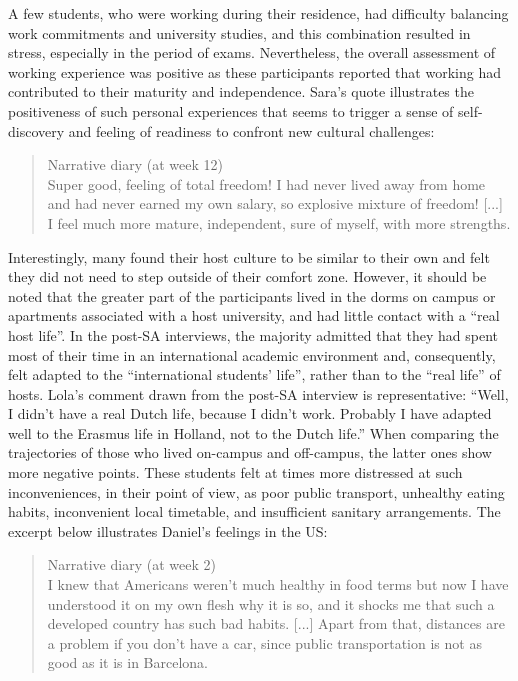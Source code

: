 \documentclass[output=paper]{langsci/langscibook}
\begin{document}
A few students, who were working during their residence, had difficulty balancing work commitments and university studies, and this combination resulted in stress, especially in the period of exams. Nevertheless, the overall assessment of working experience was positive as these participants reported that working had contributed to their maturity and independence. Sara’s quote illustrates the positiveness of such personal experiences that seems to trigger a sense of self-discovery and feeling of readiness to confront new cultural challenges:

\begin{quote}
Narrative diary (at week 12) 
\smallskip\\
Super good, feeling of total freedom! I had never lived away from home and had never earned my own salary, so explosive mixture of freedom! [...] I feel much more mature, independent, sure of myself, with more strengths. 
\end{quote}

Interestingly, many found their host culture to be similar to their own and felt they did not need to step outside of their comfort zone. However, it should be noted that the greater part of the participants lived in the dorms on campus or apartments associated with a host university, and had little contact with a “real host life”. In the post-SA interviews, the majority admitted that they had spent most of their time in an international academic environment and, consequently, felt adapted to the “international students’ life”, rather than to the “real life” of hosts. Lola’s comment drawn from the post-SA interview is representative: “Well, I didn’t have a real Dutch life, because I didn’t work. Probably I have adapted well to the Erasmus life in Holland, not to the Dutch life.” When comparing the trajectories of those who lived on-campus and off-campus, the latter ones show more negative  points. These students felt at times more distressed at such inconveniences, in their point of view, as poor public transport, unhealthy eating habits, inconvenient local timetable, and insufficient sanitary arrangements. The excerpt below illustrates Daniel’s feelings in the US:

\begin{quote}
Narrative diary (at week 2)
\smallskip\\
I knew that Americans weren’t much healthy in food terms but now I have understood it on my own flesh why it is so, and it shocks me that such a developed country has such bad habits. [...] Apart from that, distances are a problem if you don’t have a car, since public transportation is not as good as it is in Barcelona.
\end{quote}
\end{document}
